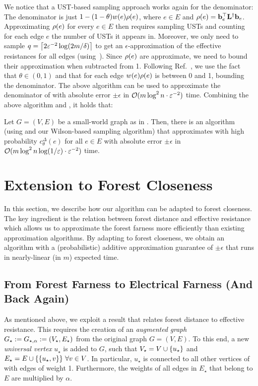 We notice that a UST-based sampling approach works again for the denominator:
The denominator is just $1 - (1 - \theta)w(e)\rho(e)$, where $e\in E$ and
$\rho(e) = \mathbf{b}_e^\top\mathbf{L}^\dagger\mathbf{b}_e$.
Approximating $\rho(e)$ for every $e\in E$ then requires sampling USTs and counting for each edge
$e$ the number of USTs it appears in. Moreover, we only need to sample
$q = \ceil{2\epsilon^{-2}\log(2m/\delta)}$ to get an $\epsilon$-approximation of the
effective resistances for all edges (using~\cite[Theorem 8]{DBLP:conf/ijcai/HayashiAY16}).
Since $\rho(e)$ are approximate, we need to bound their approximation when subtracted
from 1. Following Ref.~\cite{DBLP:conf/soda/LiZ18}, we use the fact that $\theta\in(0, 1)$
and that for each edge $w(e)\rho(e)$ is between 0 and 1, bounding the denominator.
The above algorithm can be used to approximate the denominator of 
with absolute error $\pm\epsilon$ in $\mathcal{O}(m\log^2n\cdot\varepsilon^{-2})$ time.
Combining the above algorithm and , it holds that:

\begin{proposition}
Let $G = (V, E)$ be a small-world graph as in .
Then, there is an algorithm (using  and our Wilson-based
sampling algorithm) that approximates with high probability $c_{\theta}^{\Delta}(e)$
for all $e \in E$ with absolute error $\pm\epsilon$
in $\mathcal{O}(m\log^2 n\log(1/\varepsilon)\cdot\varepsilon^{-2})$ time.
\end{proposition}

\section{Extension to Forest Closeness}
\label{sec:el-clos:forest-clos-extension}
In this section, we describe how our algorithm can be adapted to forest closeness.
The key ingredient is the relation between forest distance and effective resistance
which allows us to approximate the forest farness more efficiently than
existing approximation algorithms.
By adapting  to forest closeness, we obtain an algorithm
with a (probabilistic) additive approximation guarantee of $\pm\epsilon$ that
runs in nearly-linear (in $m$) expected time.

\subsection{From Forest Farness to Electrical Farness (And Back Again)}
\label{sec:el-clos:ffarn-elfarn}
As mentioned above, we exploit a result that relates forest distance to
effective resistance. This requires the creation of an \emph{augmented graph}
$G_{\star} := G_{\star,\alpha} := (V_{\star}, E_{\star})$ from the original graph
$G = (V, E)$. To this end, a new \emph{universal vertex} $u_\star$ is added
to $G$, such that $V_\star = V \cup \set{u_\star}$ and
$E_\star = E \cup \set{\set{u_\star, v}}\ \forall v \in V$.
In particular, $u_\star$ is connected to all other vertices of \gstar
with edges of weight 1.
Furthermore, the weights of all edges in $E_\star$ that belong to $E$
are multiplied by $\alpha$.

